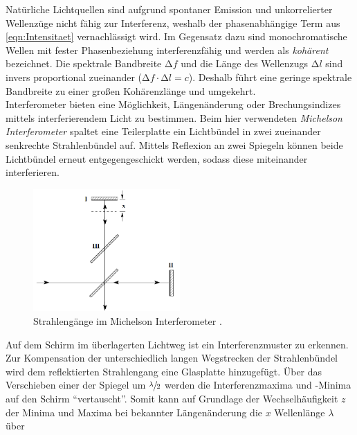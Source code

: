 \noindent Natürliche Lichtquellen sind aufgrund spontaner Emission und unkorrelierter Wellenzüge nicht fähig zur Interferenz, weshalb der 
phasenabhängige Term aus \eqref{eqn:Intensitaet} vernachlässigt wird. Im Gegensatz dazu sind monochromatische Wellen mit fester 
Phasenbeziehung interferenzfähig und werden als \emph{kohärent} bezeichnet. Die spektrale Bandbreite $\increment{}f$ und die Länge des 
Wellenzugs $\increment{}l$ sind invers proportional zueinander ($\increment{}f\cdot\increment{}l = c$). Deshalb führt eine geringe 
spektrale Bandbreite zu einer großen Kohärenzlänge und umgekehrt.\\
    Interferometer bieten eine Möglichkeit, Längenänderung oder Brechungsindizes mittels interferierendem Licht zu bestimmen.
    Beim hier verwendeten \emph{Michelson Interferometer} spaltet eine Teilerplatte ein Lichtbündel in zwei zueinander senkrechte 
    Strahlenbündel auf. Mittels Reflexion an zwei Spiegeln können beide Lichtbündel erneut entgegengeschickt werden, sodass diese miteinander 
    interferieren.
%
%
\begin{figure}
    \vspace{-20pt}
    \begin{center}
        \includegraphics[width=0.5\textwidth]{content/Michelson_Interferom.png}
        \caption{Strahlengänge im Michelson Interferometer \cite{Versuchsanleitung_v401}.}
    \end{center}
\end{figure}

\noindent Auf dem Schirm im überlagerten Lichtweg ist ein Interferenzmuster zu erkennen. Zur Kompensation der unterschiedlich langen 
Wegstrecken der Strahlenbündel wird dem reflektierten Strahlengang eine Glasplatte hinzugefügt. Über das Verschieben einer der 
Spiegel um $\sfrac{\lambda}{2}$ werden die Interferenzmaxima und -Minima auf den Schirm \enquote{vertauscht}. Somit kann auf Grundlage 
der Wechselhäufigkeit $z$ der Minima und Maxima bei bekannter Längenänderung die $x$ Wellenlänge $\lambda$ über 

